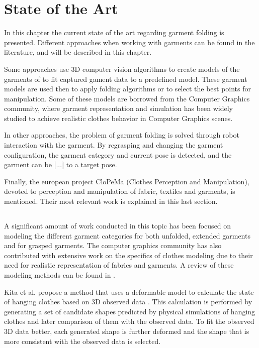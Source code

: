 \chapter{State of the Art}
\label{state_of_the_art}

In this chapter the current state of the art regarding garment folding is presented. Different approaches when working with garments can be found in the literature, and will be described in this chapter.

Some approaches use 3D computer vision algorithms to create models of the garments of to fit captured gament data to a predefined model. These garment models are used then to apply folding algorithms or to select the best points for manipulation. Some of these models are borrowed from the Computer Graphics community, where garment representation and simulation has been widely studied to achieve realistic clothes behavior in Computer Graphics scenes.

In other approaches, the problem of garment folding is solved through robot interaction with the garment. By regrasping and changing the garment configuration, the garment category and current pose is detected, and the garment can be [...] to a target pose.

Finally, the european project CloPeMa (Clothes Perception and Manipulation), devoted to perception and manipulation of fabric, textiles and garments, is mentioned. Their most relevant  work is explained in this last section.


\section{}

A significant amount of work conducted in this topic has been focused on modeling the different garment categories for both unfolded, extended garments and for grasped garments. The computer graphics community has also contributed with extensive work on the specifics of clothes modeling due to their need for realistic representation of fabrics and garments. A review of these modeling methods can be found in \cite{Chen2009}. 

Kita et al. propose a method that uses a deformable model to calculate the state of hanging clothes based on 3D observed data \cite{Kita2004, Kita2009}. This calculation is performed by generating a set of candidate shapes predicted by physical simulations of hanging clothes and later comparison of them with the observed data. To fit the observed 3D data better, each generated shape is further deformed and the shape that is more consistent with the observed data is selected. 

